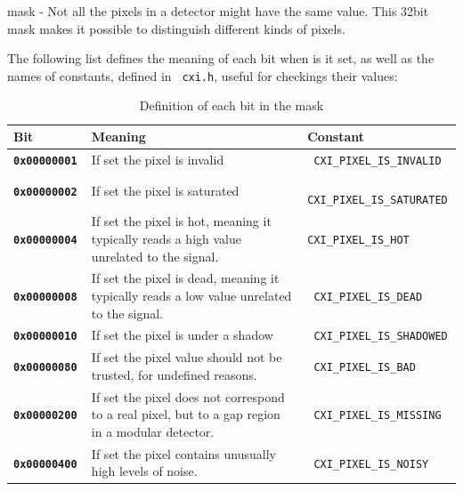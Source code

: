 \documentclass[usletter,11pt]{article}
\newcommand{\member}[2]
{ \noindent
{ \color{softBlue}  #1 - } #2
\vspace{0.2cm}
}
\begin{document}
\member{mask}{Not all the pixels in a detector might have the same
  value. This 32bit mask makes it possible to distinguish different
  kinds of pixels.

The following list defines the meaning of each
bit when is it set, as well as the names of constants, defined in {\tt
cxi.h}, useful for
checkings their values:

\begin{table}[h!]\footnotesize
\caption{Definition of each bit in the mask}
\begin{tabular*}{\textwidth}{@{\extracolsep{\fill}} l p{5.5cm} l}
\toprule
\sf \bfseries Bit & \sf \bfseries Meaning & \sf \bfseries Constant \\
\midrule

\tt \bfseries 0x00000001 & \sf If set the pixel is invalid & \tt
CXI\_PIXEL\_IS\_INVALID\\
\tt \bfseries 0x00000002 & \sf If set the pixel is saturated & \tt
CXI\_PIXEL\_IS\_SATURATED\\
\tt \bfseries 0x00000004 & \sf If set the pixel is hot, meaning it typically reads a high
value unrelated to the signal. & 
\tt CXI\_PIXEL\_IS\_HOT\\
\tt \bfseries 0x00000008 & \sf If set the pixel is dead, meaning it typically reads a low
value unrelated to the signal. & \tt
CXI\_PIXEL\_IS\_DEAD\\
\tt \bfseries 0x00000010 & \sf If set the pixel is under a shadow & \tt
CXI\_PIXEL\_IS\_SHADOWED\\
\tt \bfseries 0x00000080 & \sf If set the pixel value should not be trusted, for
undefined reasons. & \tt
CXI\_PIXEL\_IS\_BAD\\
\tt \bfseries 0x00000200 & \sf If set the pixel does not correspond to a real
pixel, but to a gap region in a modular detector. & \tt
CXI\_PIXEL\_IS\_MISSING\\
\tt \bfseries 0x00000400 & \sf If set the pixel contains unusually high levels
of noise. & \tt
CXI\_PIXEL\_IS\_NOISY\\

\end{tabular*}
\end{table}}
\end{document}
